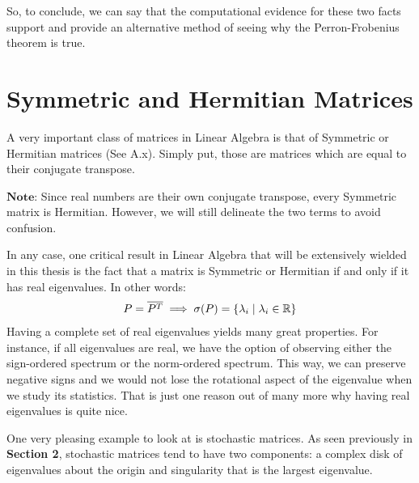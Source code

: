  So, to conclude, we can say that the computational evidence for these two facts support and provide an alternative method of seeing why the Perron-Frobenius theorem is true.

\newpage
\section{Symmetric and Hermitian Matrices}

A very important class of matrices in Linear Algebra is that of Symmetric or Hermitian matrices (See A.x). Simply put, those are matrices which are equal to their conjugate transpose.

$\textbf{Note:}$ Since real numbers are their own conjugate transpose, every Symmetric matrix is Hermitian. However, we will still delineate the two terms to avoid confusion.

In any case, one critical result in Linear Algebra that will be extensively wielded in this thesis is the fact that a matrix is Symmetric or Hermitian if and only if it has real eigenvalues. In other words:
\begin{align*}
P = \overline{P^{T}} \implies \sigma(P) = \{\lambda_i \mid \lambda_i \in \mathbb{R}\}
\end{align*}
Having a complete set of real eigenvalues yields many great properties. For instance, if all eigenvalues are real, we have the option of observing either the sign-ordered spectrum or the norm-ordered spectrum. This way, we can preserve negative signs and we would not lose the rotational aspect of the eigenvalue when we study its statistics. That is just one reason out of many more why having real eigenvalues is quite nice.


One very pleasing example to look at is stochastic matrices. As seen previously in \textbf{Section 2}, stochastic matrices tend to have two components: a complex disk of eigenvalues about the origin and singularity that is the largest eigenvalue.

